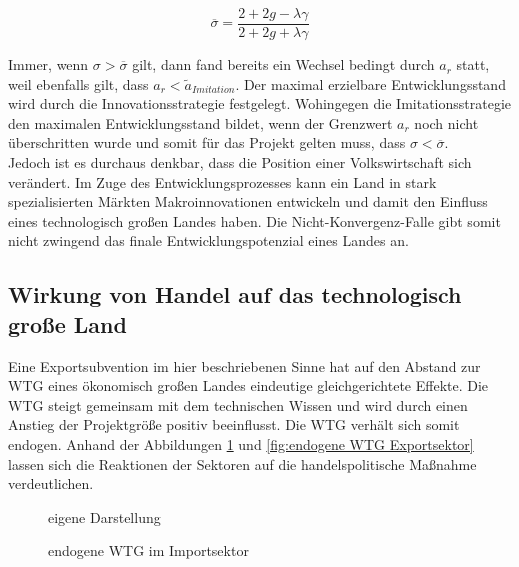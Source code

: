 	\begin{equation} 
		\overline{\sigma}=\frac{2+2g-\lambda\gamma}{2+2g+\lambda\gamma}
	\end{equation} 


Immer, wenn $\sigma>\overline{\sigma}$ gilt, dann fand bereits ein Wechsel bedingt durch $a_r$ statt, weil ebenfalls gilt, dass $a_r<\tilde{a}_{Imitation}$. Der maximal erzielbare Entwicklungsstand wird durch die Innovationsstrategie festgelegt. Wohingegen die Imitationsstrategie den maximalen Entwicklungsstand bildet, wenn der Grenzwert $a_r$ noch nicht überschritten wurde und somit für das Projekt gelten muss, dass $\sigma<\overline{\sigma}$.\\
Jedoch ist es durchaus denkbar, dass die Position einer Volkswirtschaft sich verändert. Im Zuge des Entwicklungsprozesses kann ein Land in stark spezialisierten Märkten Makroinnovationen entwickeln und damit den Einfluss eines technologisch großen Landes haben. Die Nicht-Konvergenz-Falle gibt somit nicht zwingend das finale Entwicklungspotenzial eines Landes an. 


\subsection{Wirkung von Handel auf das technologisch große Land}
Eine Exportsubvention im hier beschriebenen Sinne hat auf den Abstand zur WTG eines ökonomisch großen Landes eindeutige gleichgerichtete Effekte. Die WTG steigt gemeinsam mit dem technischen Wissen und wird durch einen Anstieg der Projektgröße positiv beeinflusst. Die WTG verhält sich somit endogen.  
Anhand der Abbildungen \ref{fig:endogene WTG Importsektor} und \ref{fig:endogene WTG Exportsektor} lassen sich die Reaktionen der Sektoren auf die handelspolitische Maßnahme verdeutlichen.\\

	\begin{figure}[htb]
		\hfill{}  eigene Darstellung
		\caption{endogene WTG im Importsektor}
		\label{fig:endogene WTG Importsektor}
	\end{figure}

